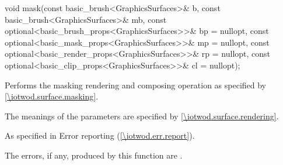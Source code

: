 %
\begin{itemdecl}
void mask(const basic_brush<GraphicsSurfaces>& b,
  const basic_brush<GraphicsSurfaces>& mb,
  const optional<basic_brush_props<GraphicsSurfaces>>& bp = nullopt,
  const optional<basic_mask_props<GraphicsSurfaces>>& mp = nullopt,
  const optional<basic_render_props<GraphicsSurfaces>>& rp = nullopt,
  const optional<basic_clip_props<GraphicsSurfaces>>& cl = nullopt);
\end{itemdecl}
\begin{itemdescr}
\pnum
\effects
Performs the masking rendering and composing operation as specified by \ref{\iotwod.surface.masking}.

\pnum
The meanings of the parameters are specified by \ref{\iotwod.surface.rendering}.

\pnum
\throws
As specified in Error reporting (\ref{\iotwod.err.report}).

\pnum
\errors

The errors, if any, produced by this function are .
\end{itemdescr}
